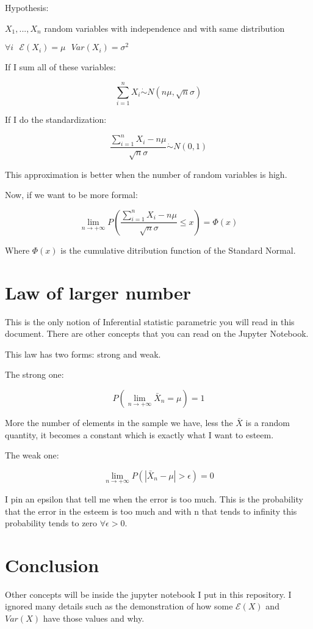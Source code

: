 \documentclass{article}
\begin{document}
Hypothesis:

$X_1,...,X_n$ random variables with independence and with same distribution

$\forall i \ \ \ \mathcal E(X_i) = \mu \ \ \ Var(X_i) = \sigma^2$

\bigskip

If I sum all of these variables:

$$\sum_{i=1}^n X_i \dot \sim N(n\mu,\sqrt{n}\sigma)$$

\bigskip

\bigskip

If I do the standardization:

$$\frac{\sum_{i=1}^n X_i - n\mu}{\sqrt{n}\sigma} \dot \sim N(0,1)$$

This approximation is better when the number of random variables is high.

Now, if we want to be more formal:

$$\lim_{n \rightarrow +\infty} P\left(\frac{\sum_{i=1}^n X_i - n\mu}{\sqrt{n} \sigma} \leq x\right) = \Phi(x)$$

Where $\Phi(x)$ is the cumulative ditribution function of the Standard Normal.

\section{Law of larger number}

This is the only notion of Inferential statistic parametric you will read in this document. There are other concepts that you can read on the Jupyter Notebook.

This law has two forms: strong and weak.

\bigskip

The strong one:

$$P\left(\lim_{n \rightarrow + \infty} \bar X_n =\mu\right) = 1$$

More the number of elements in the sample we have, less the $\bar X$ is a random quantity, it becomes a constant which is exactly what I want to esteem.


\bigskip

The weak one:

$$\lim_{n \rightarrow + \infty} P\left(|\bar X_n - \mu| > \epsilon\right) = 0$$

I pin an epsilon that tell me when the error is too much. This is the probability that the error in the esteem is too much and with n that tends to infinity this probability tends to zero $\forall \epsilon > 0$.

\section{Conclusion}

Other concepts will be inside the jupyter notebook I put in this repository.
I ignored many details such as the demonstration of how some $\mathcal E(X)$ and $Var(X)$ have those values and why.
\end{document}
